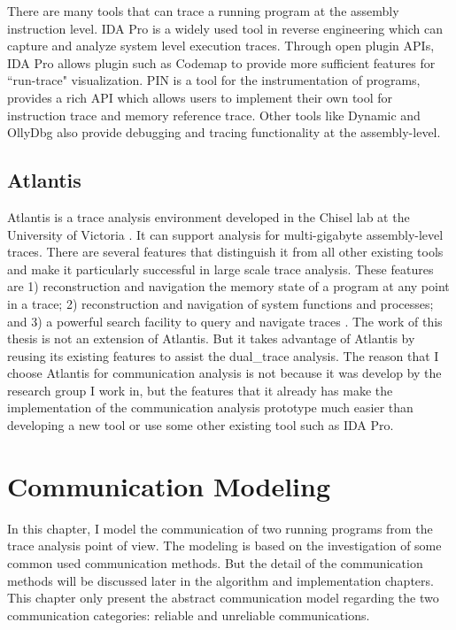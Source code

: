 \documentclass[12pt,oneside]{book}
\newcommand\startchapter[1]{\chapter{#1}\thispagestyle{myheadings}}
\begin{document}
There are many tools that can trace a running program at the assembly instruction level.  IDA Pro \cite{eagle_ida_2008} is a widely used tool in reverse engineering which can capture and analyze system level execution traces. Through open plugin APIs, IDA Pro allows plugin such as Codemap \cite{_c0demap/codemap:_????} to provide more sufficient features for ``run-trace" visualization. PIN \cite{_pin_????} is a tool for the instrumentation of programs, provides a rich API which allows users to implement their own tool for instruction trace and memory reference trace. Other tools like Dynamic \cite{brueningqz} and OllyDbg \cite{yuschuk2007ollydbg} also provide debugging and tracing functionality at the assembly-level. 

\section{Atlantis}
Atlantis is a trace analysis environment developed in the Chisel lab at the University of Victoria \cite{huang2017atlantis}. It can support analysis for multi-gigabyte assembly-level traces. There are several features that distinguish it from all other existing tools and make it particularly successful in large scale trace analysis. These features are 1) reconstruction and navigation the memory state of a program at any point in a trace; 2) reconstruction and navigation of system functions and processes; and 3) a powerful search facility to query and navigate traces \cite{huang2017atlantis}. The work of this thesis is not an extension of Atlantis. But it takes advantage of Atlantis by reusing its existing features to assist the dual\_trace analysis. The reason that I choose Atlantis for communication analysis is not because it was develop by the research group I work in, but the features that it already has make the implementation of the communication analysis prototype much easier than developing a new tool or use some other existing tool such as IDA Pro.





    
\startchapter{Communication Modeling}
\label{chapter:mod}
In this chapter, I model the communication of two running programs from the trace analysis point of view. The modeling is based on the investigation of some common used communication methods. But the detail of the communication methods will be discussed later in the algorithm and implementation chapters. This chapter only present the abstract communication model regarding the two communication categories: reliable and unreliable communications. 
\end{document}
